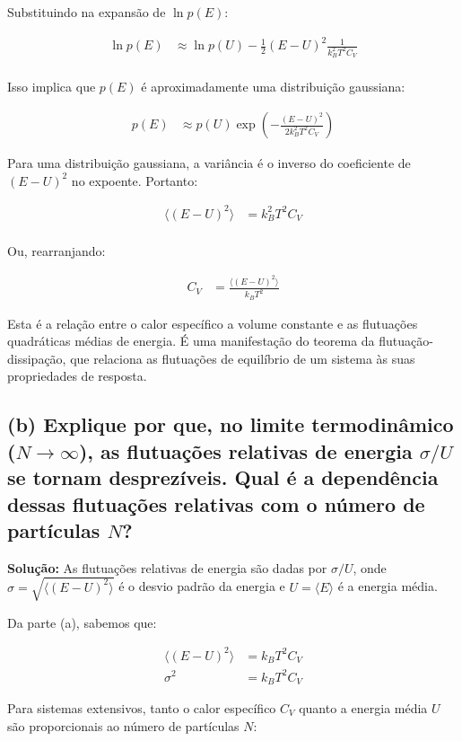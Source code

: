 \documentclass[fleqn,a4paper]{article}
\begin{document}
Substituindo na expansão de $\ln p(E)$:

\begin{align}
\ln p(E) &\approx \ln p(U) - \frac{1}{2}(E-U)^2\frac{1}{k_B^2 T^2 C_V} \\
\end{align}

Isso implica que $p(E)$ é aproximadamente uma distribuição gaussiana:

\begin{align}
p(E) &\approx p(U) \exp\left(-\frac{(E-U)^2}{2k_B^2 T^2 C_V}\right)
\end{align}

Para uma distribuição gaussiana, a variância é o inverso do coeficiente de $(E-U)^2$ no expoente. Portanto:

\begin{align}
\langle(E-U)^2\rangle &= k_B^2 T^2 C_V \\
\end{align}

Ou, rearranjando:

\begin{align}
C_V &= \frac{\langle(E-U)^2\rangle}{k_B T^2}
\end{align}

Esta é a relação entre o calor específico a volume constante e as flutuações quadráticas médias de energia. É uma manifestação do teorema da flutuação-dissipação, que relaciona as flutuações de equilíbrio de um sistema às suas propriedades de resposta.

\subsection*{(b) Explique por que, no limite termodinâmico ($N \to \infty$), as flutuações relativas de energia $\sigma/U$ se tornam desprezíveis. Qual é a dependência dessas flutuações relativas com o número de partículas $N$?}

\textbf{Solução:}
As flutuações relativas de energia são dadas por $\sigma/U$, onde $\sigma = \sqrt{\langle(E-U)^2\rangle}$ é o desvio padrão da energia e $U = \langle E \rangle$ é a energia média.

Da parte (a), sabemos que:

\begin{align}
\langle(E-U)^2\rangle &= k_B T^2 C_V \\
\sigma^2 &= k_B T^2 C_V
\end{align}

Para sistemas extensivos, tanto o calor específico $C_V$ quanto a energia média $U$ são proporcionais ao número de partículas $N$:
\end{document}
